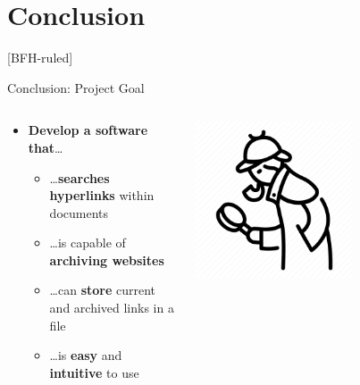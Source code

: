 \documentclass[
    ngerman,%
    authorontitle=true,
]{bfhbeamer}
\begin{document}
    \section{Conclusion}
	[BFH-ruled]
	\frame{\sectionpage}

    \begin{frame}{Conclusion: Project Goal}
        \begin{columns} %
            \begin{column}{0.5\textwidth} %
                \begin{itemize}
                    \item[\checkmark] \textbf{Develop a software that}\ldots
                    \begin{itemize}
                        \item[\checkmark] \ldots \textbf{searches hyperlinks} within documents
                        \item[\checkmark] \ldots is capable of \textbf{archiving websites}
                        \item[\checkmark] \ldots can \textbf{store} current and archived links in a file
                        \item[\checkmark] \ldots is \textbf{easy} and \textbf{intuitive} to use
                    \end{itemize}
                \end{itemize}
            \end{column}
            \begin{column}{0.3\textwidth} %
                \begin{center}
                    \includegraphics[width=0.6\textwidth]{pictures/sherlock}
                \end{center}
            \end{column}
        \end{columns}
    \end{frame}
\end{document}
